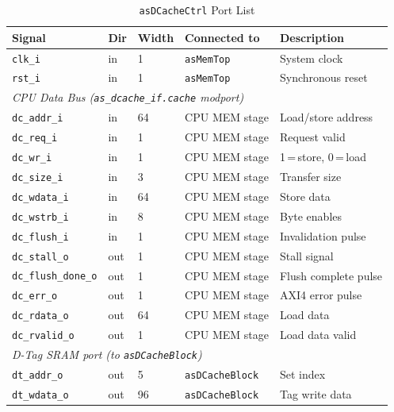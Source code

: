 \begin{table}[H]
\caption{\texttt{asDCacheCtrl} Port List}
\label{tab:asDCacheCtrlPorts}
\centering
\begin{tabularx}{\textwidth}{|l |l |l |l |X|}
  \hline
  Signal & Dir & Width & Connected to & Description \\
  \hline
  \hline
  \texttt{clk\_i}  & in & 1 & \texttt{asMemTop} & System clock \\
  \hline
  \texttt{rst\_i}  & in & 1 & \texttt{asMemTop} & Synchronous reset \\
  \hline
  \multicolumn{5}{|l|}{\textit{CPU Data Bus (\texttt{as\_dcache\_if.cache} modport)}} \\
  \hline
  \texttt{dc\_addr\_i}        & in  & 64 & CPU MEM stage & Load/store address \\
  \hline
  \texttt{dc\_req\_i}         & in  & 1  & CPU MEM stage & Request valid \\
  \hline
  \texttt{dc\_wr\_i}          & in  & 1  & CPU MEM stage & 1\,=\,store, 0\,=\,load \\
  \hline
  \texttt{dc\_size\_i}        & in  & 3  & CPU MEM stage & Transfer size \\
  \hline
  \texttt{dc\_wdata\_i}       & in  & 64 & CPU MEM stage & Store data \\
  \hline
  \texttt{dc\_wstrb\_i}       & in  & 8  & CPU MEM stage & Byte enables \\
  \hline
  \texttt{dc\_flush\_i}       & in  & 1  & CPU MEM stage & Invalidation pulse \\
  \hline
  \texttt{dc\_stall\_o}       & out & 1  & CPU MEM stage & Stall signal \\
  \hline
  \texttt{dc\_flush\_done\_o} & out & 1  & CPU MEM stage & Flush complete pulse \\
  \hline
  \texttt{dc\_err\_o}         & out & 1  & CPU MEM stage & AXI4 error pulse \\
  \hline
  \texttt{dc\_rdata\_o}       & out & 64 & CPU MEM stage & Load data \\
  \hline
  \texttt{dc\_rvalid\_o}      & out & 1  & CPU MEM stage & Load data valid \\
  \hline
  \multicolumn{5}{|l|}{\textit{D-Tag SRAM port (to \texttt{asDCacheBlock})}} \\
  \hline
  \texttt{dt\_addr\_o}  & out & 5   & \texttt{asDCacheBlock} & Set index \\
  \hline
  \texttt{dt\_wdata\_o} & out & 96  & \texttt{asDCacheBlock} & Tag write data \\

\end{tabularx}
\end{table}
